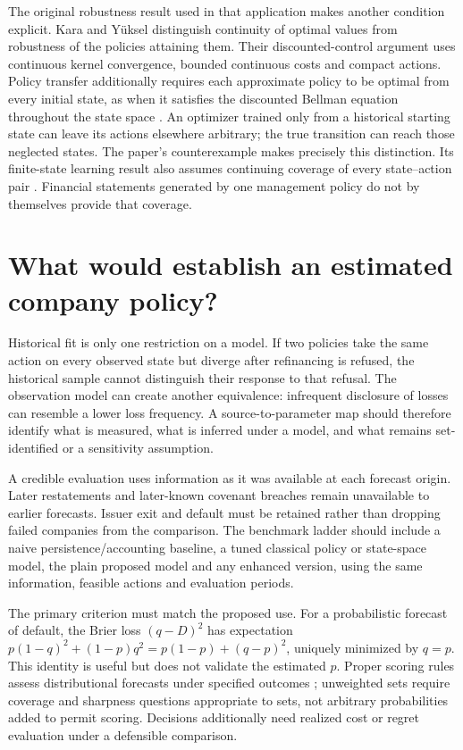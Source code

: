 \documentclass[11pt,a4paper]{article}
\begin{document}
The original robustness result used in that application makes another condition
explicit. Kara and Y\"uksel distinguish continuity of optimal values from
robustness of the policies attaining them. Their discounted-control argument
uses continuous kernel convergence, bounded continuous costs and compact
actions. Policy transfer additionally requires each approximate policy to be
optimal from every initial state, as when it satisfies the discounted Bellman
equation throughout the state space
\cite[Assumption~1.1, Theorems~4.2--4.4 and Appendix~A.5]{kara}.
An optimizer trained only from a historical starting state can leave its actions
elsewhere arbitrary; the true transition can reach those neglected states.
The paper's counterexample makes precisely this distinction. Its finite-state
learning result also assumes continuing coverage of every state--action pair
\cite[Corollary~5.1]{kara}. Financial statements generated by one management
policy do not by themselves provide that coverage.

\section{What would establish an estimated company policy?}
Historical fit is only one restriction on a model. If two policies take the
same action on every observed state but diverge after refinancing is refused,
the historical sample cannot distinguish their response to that refusal.
The observation model can create another equivalence: infrequent disclosure
of losses can resemble a lower loss frequency. A source-to-parameter map
should therefore identify what is measured, what is inferred under a model,
and what remains set-identified or a sensitivity assumption.

A credible evaluation uses information as it was available at each forecast
origin. Later restatements and later-known covenant breaches remain unavailable
to earlier forecasts. Issuer exit and default must be retained rather than
dropping failed companies from the comparison. The benchmark ladder should
include a naive persistence/accounting baseline, a tuned classical policy or
state-space model, the plain proposed model and any enhanced version, using
the same information, feasible actions and evaluation periods.

The primary criterion must match the proposed use. For a probabilistic
forecast of default, the Brier loss $(q-D)^2$ has expectation
$p(1-q)^2+(1-p)q^2=p(1-p)+(q-p)^2$, uniquely minimized by $q=p$. This
identity is useful but does not validate the estimated $p$. Proper scoring
rules assess distributional forecasts under specified outcomes
\cite{gneiting}; unweighted sets require coverage and sharpness questions
appropriate to sets, not arbitrary probabilities added to permit scoring.
Decisions additionally need realized cost or regret evaluation under a
defensible comparison.
\end{document}
